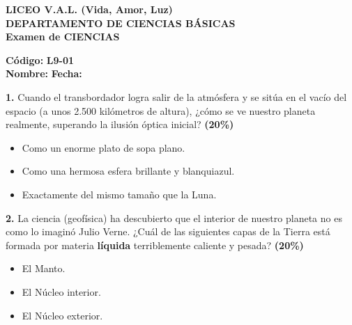 \documentclass[12pt, letterpaper]{article}
\begin{document}
	
	\begin{center} 
		{\Large \textbf{LICEO V.A.L. (Vida, Amor, Luz)}}\\[0.2cm] 
		{\large \textbf{DEPARTAMENTO DE CIENCIAS BÁSICAS}}\\[0.2cm] 
		\textbf{Examen de CIENCIAS}\\[0.1cm] 
	\end{center}
	
	\vspace{0.3cm}
	\hfill \textbf{Código:} \textbf{L9-01}\\[0.1cm]
	\noindent \textbf{Nombre:} \underline{\hspace{8cm}} \hspace{1cm}\textbf{Fecha:} \underline{\hspace{3cm}}
	\vspace{0.8cm}
	
	
	\noindent \textbf{1.} Cuando el transbordador logra salir de la atmósfera y se sitúa en el vacío del espacio (a unos 2.500 kilómetros de altura), ¿cómo se ve nuestro planeta realmente, superando la ilusión óptica inicial? \hfill\textbf{(20\%)}
	
	\vspace{0.3cm} 
	\begin{itemize}[itemsep=0.4cm, label={}] 
		\item[ $\square$ ] Como un enorme plato de sopa plano. 
		\item[ $\square$ ] Como una hermosa esfera brillante y blanquiazul. 
		\item[ $\square$ ] Exactamente del mismo tamaño que la Luna. 
	\end{itemize}
	
	\vspace{0.5cm}
	
	\noindent \textbf{2.} La ciencia (geofísica) ha descubierto que el interior de nuestro planeta no es como lo imaginó Julio Verne. ¿Cuál de las siguientes capas de la Tierra está formada por materia \textbf{líquida} terriblemente caliente y pesada? \hfill\textbf{(20\%)}
	
	\vspace{0.3cm} 
	\begin{itemize}[itemsep=0.4cm, label={}] 
		\item[ $\square$ ] El Manto. 
		\item[ $\square$ ] El Núcleo interior.
		\item[ $\square$ ] El Núcleo exterior. 
	\end{itemize}
	
\end{document}
